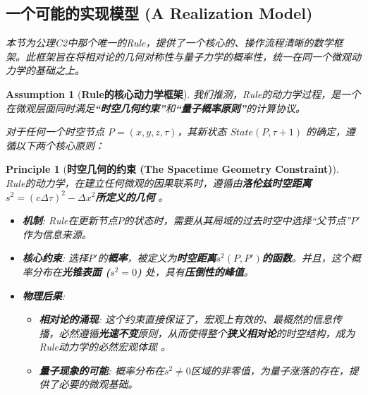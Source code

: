 \documentclass[11pt, a4paper]{article}
\newtheorem{principle}{Principle}[section]  %
\newtheorem{assumption}{Assumption}[section] %
\begin{document}
\subsection*{一个可能的实现模型 (A Realization Model)}

\textit{本节为公理C2中那个唯一的Rule，提供了一个核心的、操作流程清晰的数学框架。此框架旨在将相对论的几何对称性与量子力学的概率性，统一在同一个微观动力学的基础之上。}

\begin{assumption}[\textbf{Rule的核心动力学框架}]
我们推测，Rule的动力学过程，是一个在微观层面同时满足\textbf{“时空几何约束”}和\textbf{“量子概率原则”}的计算协议。

对于任何一个时空节点 $P = (x, y, z, \tau)$，其新状态 $State(P, \tau+1)$ 的确定，遵循以下两个核心原则：
\end{assumption}

\begin{principle}[\textbf{时空几何的约束 (The Spacetime Geometry Constraint)}]
Rule的动力学，在建立任何微观的因果联系时，遵循由\textbf{洛伦兹时空距离$s^2 = (c\Delta\tau)^2 - \Delta x^2$所定义的几何} \cite{Einstein1905}。
\begin{itemize}
    \item \textbf{机制}: Rule在更新节点$P$的状态时，需要从其局域的过去时空中选择“父节点”$P'$作为信息来源。
    \item \textbf{核心约束}: 选择$P'$的\textbf{概率}，被定义为\textbf{时空距离$s^2(P, P')$的函数}。并且，这个概率分布在\textbf{光锥表面 ($s^2 = 0$)} 处，具有\textbf{压倒性的峰值}。
    \item \textbf{物理后果}:
    \begin{itemize}
        \item \textbf{相对论的涌现}: 这个约束直接保证了，宏观上有效的、最概然的信息传播，必然遵循\textbf{光速不变}原则，从而使得整个\textbf{狭义相对论}的时空结构，成为Rule动力学的必然宏观体现 \cite{Einstein1905}。
        \item \textbf{量子现象的可能}: 概率分布在$s^2 \ne 0$区域的非零值，为量子涨落的存在，提供了必要的微观基础。
    \end{itemize}
\end{itemize}
\end{principle}
\end{document}
